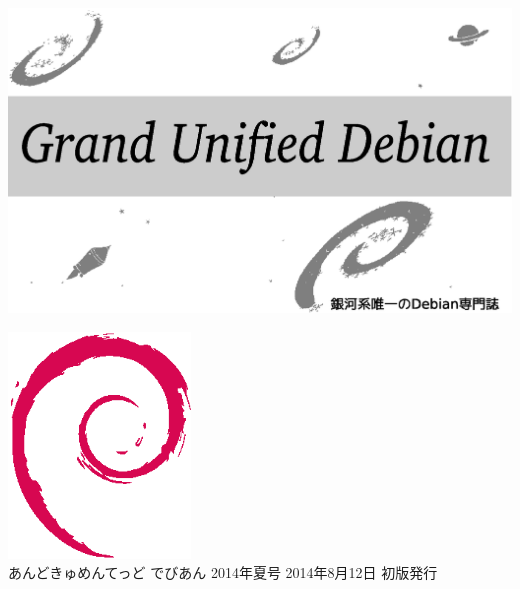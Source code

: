 \documentclass[mingoth,a4paper]{jsarticle}
\begin{document}
\begin{titlepage}
\thispagestyle{empty}

\hspace*{-2.5cm}
\includegraphics{image2012-natsu/gudeb.eps}\\
\vspace*{0.1cm}

\vspace*{2cm}

\vspace*{-1.5cm}
\hspace*{11cm}\includegraphics[height=6cm]{image200502/openlogo-nd.eps}\\
\vspace*{0.1cm}
\hfill あんどきゅめんてっど でびあん 2014年夏号 2014年8月12日 初版発行
\end{titlepage}

\newpage
\thispagestyle{empty}\mbox{}
\newpage
\end{document}
